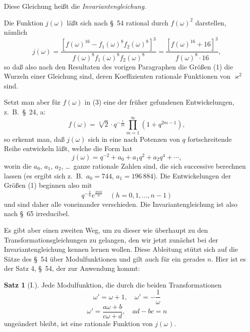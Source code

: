 \documentclass[12pt,a4paper]{article}
\theoremstyle{definition}
\newtheorem*{satz}{Satz}
\begin{document}
Diese Gleichung heißt die \emph{Invariantengleichung}.

Die Funktion $j(\omega)$ läßt sich nach \S\ 54 rational durch $f(\omega)^2$ darstellen, nämlich
\begin{equation}\label{eq:69-3}
j(\omega) = \frac{[f(\omega)^{16} - f_1(\omega)^8 f_2(\omega)^8]^3}{f(\omega)^8 f_1(\omega)^8 f_2(\omega)^8} = \frac{[f(\omega)^{16} + 16]^3}{f(\omega)^8 \cdot 16},
\end{equation}
so daß also nach den Resultaten des vorigen Paragraphen die Größen (1) die Wurzeln einer Gleichung sind, deren Koeffizienten rationale Funktionen von $\varkappa^2$ sind.

Setzt man aber für $f(\omega)$ in (3) eine der früher gefundenen Entwickelungen, z.~B.\ \S\ 24, a:
\[
f(\omega) = \sqrt[4]{2} \cdot q^{-\frac{1}{24}} \prod_{m=1}^{\infty} (1 + q^{2m-1}),
\]
so erkennt man, daß $j(\omega)$ sich in eine nach Potenzen von $q$ fortschreitende Reihe entwickeln läßt, welche die Form hat
\begin{equation}\label{eq:69-4}
j(\omega) = q^{-2} + a_0 + a_1 q^2 + a_2 q^4 + \cdots,
\end{equation}
worin die $a_0$, $a_1$, $a_2$, \ldots\ ganze rationale Zahlen sind, die sich successive berechnen lassen (es ergibt sich z.~B.\ $a_0 = 744$, $a_1 = 196\,884$). Die Entwickelungen der Größen (1) beginnen also mit
\begin{equation}\label{eq:69-5}
q^{-\frac{2}{n}} e^{\frac{2\pi i h}{n}} \quad (h = 0, 1, \ldots, n-1)
\end{equation}
und sind daher alle voneinander verschieden. Die Invariantengleichung ist also nach \S\ 65 irreducibel.

Es gibt aber einen zweiten Weg, um zu dieser wie überhaupt zu den Transformationsgleichungen zu gelangen, den wir jetzt zunächst bei der Invariantengleichung kennen lernen wollen. Diese Ableitung stützt sich auf die Sätze des \S\ 54 über Modulfunktionen und gilt auch für ein gerades $n$. Hier ist es der Satz 4, \S\ 54, der zur Anwendung kommt:

\begin{satz}[I.]
Jede Modulfunktion, die durch die beiden Transformationen
\begin{equation}\label{eq:69-6}
\omega' = \omega + 1, \quad \omega' = -\frac{1}{\omega}
\end{equation}
\begin{equation}\label{eq:69-7}
\omega' = \frac{a\omega + b}{c\omega + d}, \quad ad - bc = n
\end{equation}
ungeändert bleibt, ist eine rationale Funktion von $j(\omega)$.
\end{satz}
\end{document}
